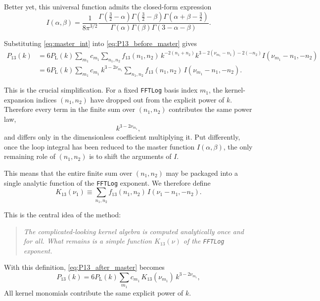 \documentclass[a4paper,11pt]{article}
\newcommand{\codefont}[1]{{\texttt{#1}}}
\def\Plin{P_{\rm L}}
\renewcommand{\emph}[1]{\textit{#1}}
\newcommand{\<}{\langle}
\renewcommand{\>}{\rangle}
\def\Plin{P_\text{L}}
\begin{document}
Better yet, this universal function admits the closed-form expression
\begin{equation}
I(\alpha,\beta)
=
\frac{1}{8\pi^{3/2}}
\frac{
\Gamma\!\left(\frac32-\alpha\right)
\Gamma\!\left(\frac32-\beta\right)
\Gamma\!\left(\alpha+\beta-\frac32\right)
}{
\Gamma(\alpha)\Gamma(\beta)\Gamma(3-\alpha-\beta)
}.
\end{equation}

Substituting \cref{eq:master_int} into \cref{eq:P13_before_master} gives
\begin{align}
P_{13}(k)
&=
6 \Plin(k)
\sum_{m_1} c_{m_1}
\sum_{n_1,n_2}
f_{13}(n_1,n_2)\,
k^{-2(n_1+n_2)}
k^{3-2(\nu_{m_1}-n_1)-2(-n_2)}
I(\nu_{m_1}-n_1,-n_2)
\nonumber\\
&=
6 \Plin(k)
\sum_{m_1} c_{m_1}\,
k^{3-2\nu_{m_1}}
\sum_{n_1,n_2}
f_{13}(n_1,n_2)\,
I(\nu_{m_1}-n_1,-n_2).
\label{eq:P13_after_master}
\end{align}

This is the crucial simplification. For a fixed \codefont{FFTLog} basis index \(m_1\), the kernel-expansion indices \((n_1,n_2)\) have dropped out from the explicit power of \(k\). Therefore every term in the finite sum over \((n_1,n_2)\) contributes the same power law,
\begin{equation}
k^{3-2\nu_{m_1}},
\end{equation}
and differs only in the dimensionless coefficient multiplying it. Put differently, once the loop integral has been reduced to the master function \(I(\alpha,\beta)\), the only remaining role of \((n_1,n_2)\) is to shift the arguments of \(I\).

This means that the entire finite sum over \((n_1,n_2)\) may be packaged into a single analytic function of the \codefont{FFTLog} exponent. We therefore define
\begin{equation}
K_{13}(\nu_1)
\equiv
\sum_{n_1,n_2}
f_{13}(n_1,n_2)\,
I(\nu_1-n_1,-n_2).
\label{eq:K13}
\end{equation}

This is the central idea of the method:

\begin{quote}
\emph{The complicated-looking kernel algebra is computed analytically once and for all. What remains is a simple function \(K_{13}(\nu)\) of the \codefont{FFTLog} exponent.}
\end{quote}

With this definition, \cref{eq:P13_after_master} becomes
\begin{equation}
P_{13}(k)
=
6 \Plin(k)
\sum_{m_1}
c_{m_1}\,
K_{13}(\nu_{m_1})\,
k^{3-2\nu_{m_1}},
\label{eq:P13_kernel_form}
\end{equation}
All kernel monomials contribute the same explicit power of \(k\).
\end{document}

